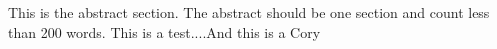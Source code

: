 This is the abstract section. The abstract should be one section and count less than 200 words. This is a test....And this is a Cory 